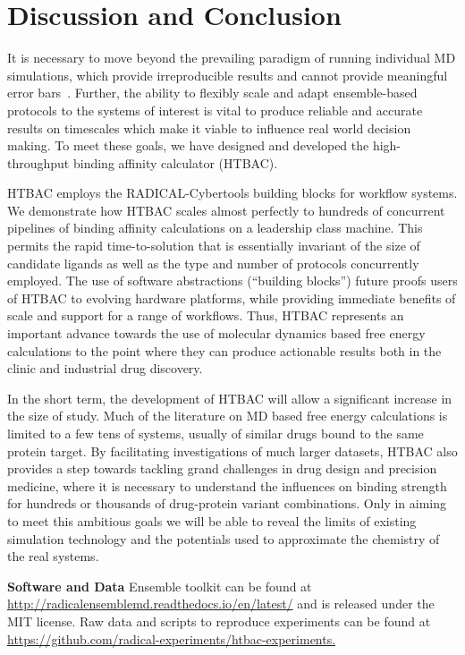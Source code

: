 \documentclass[conference]{IEEEtran}
\begin{document}
%
%
%
%
\section{Discussion and Conclusion}\label{sec:conclusion}
%

It is necessary to move beyond the prevailing paradigm of running individual
MD simulations, which provide irreproducible results and cannot provide
meaningful error bars~\cite{Bhati2017}. Further, the ability to flexibly
scale and adapt ensemble-based protocols to the systems of interest is vital
to produce reliable and accurate results on timescales which make it viable
to influence real world decision making. To meet these goals, we have
designed and developed the high-throughput binding affinity calculator
(HTBAC).

HTBAC employs the RADICAL-Cybertools building blocks for workflow systems. We
demonstrate how HTBAC scales almost perfectly to hundreds of concurrent
pipelines of binding affinity calculations on a leadership class machine.
This permits the rapid time-to-solution that is essentially invariant of the
size of candidate ligands as well as the type and number of protocols
concurrently employed. The use of software abstractions (``building blocks'')
future proofs users of HTBAC to evolving hardware platforms, while providing
immediate benefits of scale and support for a range of workflows. Thus, HTBAC
represents an important advance towards the use of molecular dynamics based
free energy calculations to the point where they can produce actionable
results both in the clinic and industrial drug discovery.

In the short term, the development of HTBAC will allow a significant increase
in the size of study. Much of the literature on MD based free energy
calculations is limited to a few tens of systems, usually of similar drugs
bound to the same protein target. By facilitating investigations of much
larger datasets, HTBAC also provides a step towards tackling grand challenges
in drug design and precision medicine, where it is necessary to understand the
influences on binding strength for hundreds or thousands of drug-protein
variant combinations. Only in aiming to meet this ambitious goals we will be
able to reveal the limits of existing simulation technology and the
potentials used to approximate the chemistry of the real systems.

\footnotesize \textbf{Software and Data} Ensemble toolkit can be found at
\url{http://radicalensemblemd.readthedocs.io/en/latest/} and is released
under the MIT license. Raw data and scripts to reproduce experiments can be
found at \url{https://github.com/radical-experiments/htbac-experiments.}
 
\end{document}
